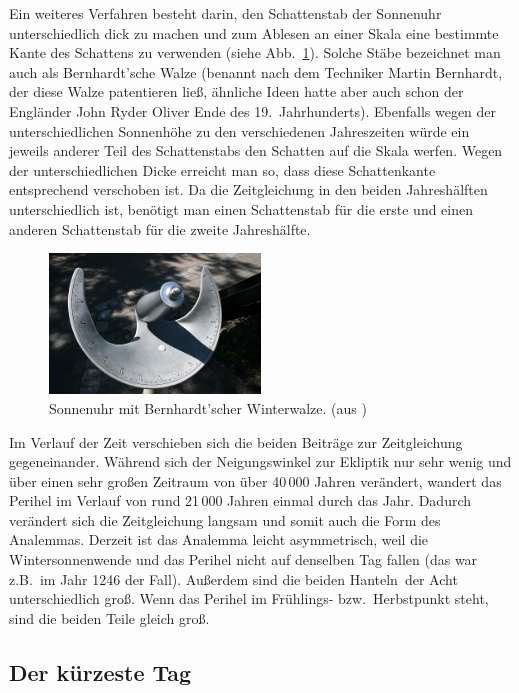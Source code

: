 Ein weiteres Verfahren besteht darin, den Schattenstab der Sonnenuhr unterschiedlich dick
zu machen und zum Ablesen an einer Skala eine bestimmte Kante des Schattens zu 
verwenden (siehe Abb.\ \ref{fig_Bernhardt}).
Solche St\"abe bezeichnet man auch als Bernhardt'sche Walze (benannt nach dem Techniker
Martin Bernhardt, 
der diese Walze patentieren lie\ss, \"ahnliche Ideen hatte aber auch schon
der Engl\"ander John Ryder Oliver Ende des 19.\ Jahrhunderts). 
Ebenfalls wegen der unterschiedlichen Sonnenh\"ohe zu den verschiedenen Jahreszeiten
w\"urde ein jeweils anderer Teil des Schattenstabs den Schatten auf die Skala werfen. Wegen
der unterschiedlichen Dicke erreicht man so, dass diese Schattenkante entsprechend 
verschoben ist. Da die Zeitgleichung in den beiden Jahresh\"alften unterschiedlich ist, ben\"otigt
man einen Schattenstab f\"ur die erste und einen anderen Schattenstab f\"ur die zweite
Jahresh\"alfte.   

\begin{figure}
\includegraphics[width=0.5\textwidth]{./Bilder/Bernhardt.jpg}
\caption{\label{fig_Bernhardt}%
Sonnenuhr mit Bernhardt'scher Winterwalze. (aus \cite{Wikipedia_Sonnenuhr})}
\end{figure}

Im Verlauf der Zeit verschieben sich die beiden Beitr\"age zur Zeitgleichung gegeneinander. 
W\"ahrend sich der Neigungswinkel zur Ekliptik nur sehr wenig und \"uber einen sehr gro\ss en
Zeitraum von \"uber 40\,000 Jahren ver\"andert, wandert das Perihel im Verlauf von rund 
21\,000 Jahren einmal durch das Jahr. Dadurch ver\"andert sich die Zeitgleichung langsam
und somit auch die Form des Analemmas. Derzeit ist das Analemma leicht asymmetrisch,
weil die Wintersonnenwende und das Perihel nicht auf denselben Tag fallen (das war z.B.\ im
Jahr 1246 der Fall). Au\ss erdem sind die beiden \glqq Hanteln\grqq\ der Acht unterschiedlich 
gro\ss. Wenn das Perihel im Fr\"uhlings- bzw.\ Herbstpunkt steht, sind die beiden Teile
gleich gro\ss.  

\subsection{Der k\"urzeste Tag}

